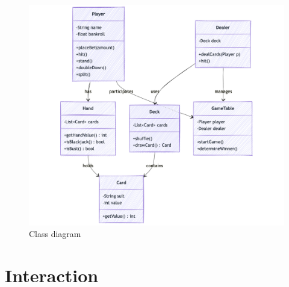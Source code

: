 \begin{figure}[!htb]
    \centering
    \includegraphics[scale=0.55]{report/img/classDiagram.png}
    \caption{Class diagram}
    \label{fig:classDiagram}
\end{figure}

\section{Interaction}

